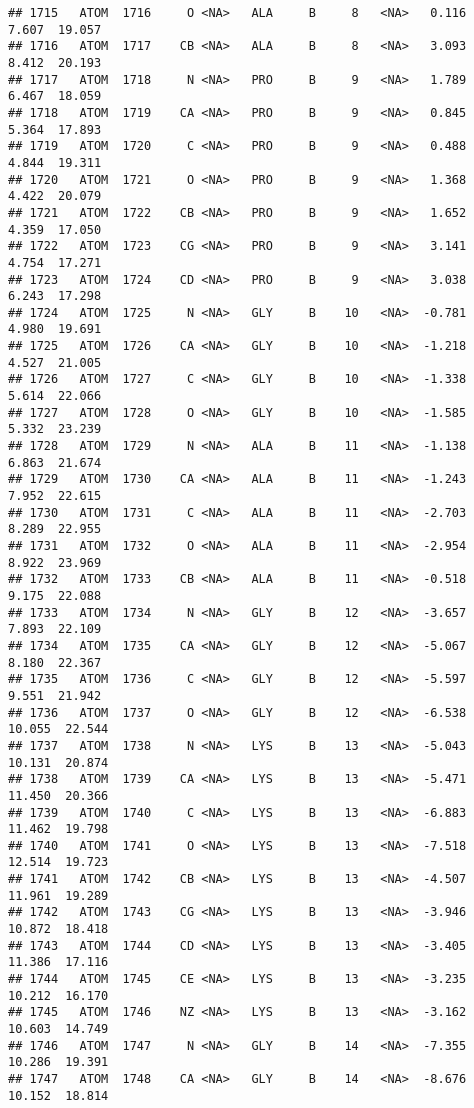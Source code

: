 \documentclass[
]{article}
\begin{document}
\begin{verbatim}
## 1715   ATOM  1716     O <NA>   ALA     B     8   <NA>   0.116   7.607  19.057
## 1716   ATOM  1717    CB <NA>   ALA     B     8   <NA>   3.093   8.412  20.193
## 1717   ATOM  1718     N <NA>   PRO     B     9   <NA>   1.789   6.467  18.059
## 1718   ATOM  1719    CA <NA>   PRO     B     9   <NA>   0.845   5.364  17.893
## 1719   ATOM  1720     C <NA>   PRO     B     9   <NA>   0.488   4.844  19.311
## 1720   ATOM  1721     O <NA>   PRO     B     9   <NA>   1.368   4.422  20.079
## 1721   ATOM  1722    CB <NA>   PRO     B     9   <NA>   1.652   4.359  17.050
## 1722   ATOM  1723    CG <NA>   PRO     B     9   <NA>   3.141   4.754  17.271
## 1723   ATOM  1724    CD <NA>   PRO     B     9   <NA>   3.038   6.243  17.298
## 1724   ATOM  1725     N <NA>   GLY     B    10   <NA>  -0.781   4.980  19.691
## 1725   ATOM  1726    CA <NA>   GLY     B    10   <NA>  -1.218   4.527  21.005
## 1726   ATOM  1727     C <NA>   GLY     B    10   <NA>  -1.338   5.614  22.066
## 1727   ATOM  1728     O <NA>   GLY     B    10   <NA>  -1.585   5.332  23.239
## 1728   ATOM  1729     N <NA>   ALA     B    11   <NA>  -1.138   6.863  21.674
## 1729   ATOM  1730    CA <NA>   ALA     B    11   <NA>  -1.243   7.952  22.615
## 1730   ATOM  1731     C <NA>   ALA     B    11   <NA>  -2.703   8.289  22.955
## 1731   ATOM  1732     O <NA>   ALA     B    11   <NA>  -2.954   8.922  23.969
## 1732   ATOM  1733    CB <NA>   ALA     B    11   <NA>  -0.518   9.175  22.088
## 1733   ATOM  1734     N <NA>   GLY     B    12   <NA>  -3.657   7.893  22.109
## 1734   ATOM  1735    CA <NA>   GLY     B    12   <NA>  -5.067   8.180  22.367
## 1735   ATOM  1736     C <NA>   GLY     B    12   <NA>  -5.597   9.551  21.942
## 1736   ATOM  1737     O <NA>   GLY     B    12   <NA>  -6.538  10.055  22.544
## 1737   ATOM  1738     N <NA>   LYS     B    13   <NA>  -5.043  10.131  20.874
## 1738   ATOM  1739    CA <NA>   LYS     B    13   <NA>  -5.471  11.450  20.366
## 1739   ATOM  1740     C <NA>   LYS     B    13   <NA>  -6.883  11.462  19.798
## 1740   ATOM  1741     O <NA>   LYS     B    13   <NA>  -7.518  12.514  19.723
## 1741   ATOM  1742    CB <NA>   LYS     B    13   <NA>  -4.507  11.961  19.289
## 1742   ATOM  1743    CG <NA>   LYS     B    13   <NA>  -3.946  10.872  18.418
## 1743   ATOM  1744    CD <NA>   LYS     B    13   <NA>  -3.405  11.386  17.116
## 1744   ATOM  1745    CE <NA>   LYS     B    13   <NA>  -3.235  10.212  16.170
## 1745   ATOM  1746    NZ <NA>   LYS     B    13   <NA>  -3.162  10.603  14.749
## 1746   ATOM  1747     N <NA>   GLY     B    14   <NA>  -7.355  10.286  19.391
## 1747   ATOM  1748    CA <NA>   GLY     B    14   <NA>  -8.676  10.152  18.814

\end{verbatim}
\end{document}

